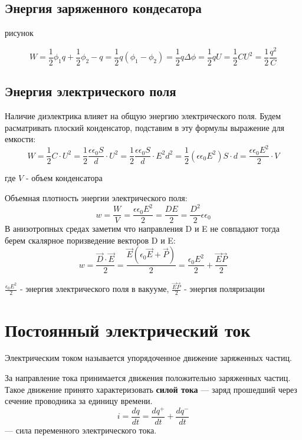 \documentclass[../main.tex]{subfiles}
\begin{document}
\subsection{Энергия заряженного кондесатора}
рисунок 

\[ W = \frac{1}{2}\phi_1 q + \frac{1}{2}\phi_2 -q = \frac{1}{2}q (\phi_1 - \phi_2) = \frac{1}{2} q \Delta \phi
    = \frac{1}{2} q U = \frac{1}{2} C U^2 =\frac{1}{2} \frac{q^2}{C}\]
\subsection{Энергия электрического поля}
Наличие диэлектрика влияет на общую энергию электрического поля. Будем расматривать плоский конденсатор, подставим в эту формулы выражение для емкости:
\[ W = \frac{1}{2} C \cdot U^2 = \frac{1}{2} \frac{\epsilon \epsilon_0 S}{d} \cdot U^2 = \frac{1}{2} \frac{\epsilon \epsilon_0 S}{d} \cdot E^2 d^2 = \frac{1}{2}(\epsilon \epsilon_0 E^2) S \cdot d =
    \frac{\epsilon \epsilon_ 0 E^2}{2} \cdot V\]
\begin{center}
    где $V$ - объем конденсатора
\end{center}

Объемная плотность энергии электрического поля:
\[w = \frac{W}{V} = \frac{\epsilon \epsilon_ 0 E^2}{2} = \frac{D E}{2} = \frac{D^2}{2} \epsilon \epsilon_0\]
В анизотропных средах заметим что направления D и E не совпадают тогда берем скалярное поризведение векторов D и E:
\[w = \frac{\vec D \cdot \vec E}{2} = \frac{\vec E (\epsilon_0 \vec E + \vec P)}{2} = \frac{\epsilon_0 E^2}{2} + \frac{\vec E \vec P}{2}\]
\begin{center}
    $\frac{\epsilon_0 E^2}{2}$ - энергия электрического поля в вакууме,
    \newline
    $\frac{\vec E \vec P}{2}$ - энергия поляризации
\end{center}

\section{Постоянный электрический ток}

 Электрическим током называется упорядоченное движение заряженных частиц.

За направление тока принимается движения положительно заряженных частиц.
 Такое движение принято характеризовать \textbf{силой тока}  --- заряд прошедший через сечение проводника за единицу времени.
\[i = \frac{dq}{dt} = \frac{dq ^{+}}{dt} + \frac{dq ^{-}}{dt}\] --- сила переменного электрического тока.
\end{document}
